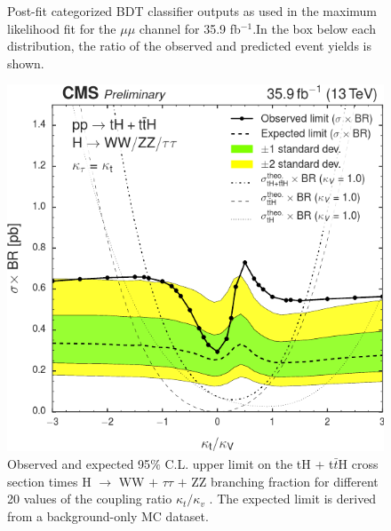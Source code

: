 \documentclass[11pt]{beamer}
\begin{document}
{\begin{frame}
\begin{multicols}{2}
\begin{center}
\begin{figure}
		\caption*{\tiny{Post-fit categorized BDT classifier outputs as used in
			the maximum likelihood fit for the $\mu\mu$ channel for
			35.9 fb$^{-1}$.In the box below each distribution, the ratio
			of the observed and predicted event yields is shown.\cite{2}
		 }}
	\end{figure}
\end{center}
\end{multicols}
\end{frame}
}
\begin{frame}
	\begin{center}
		\begin{figure}
			\includegraphics[scale=0.3]{figures/sc.png}
			\caption{Observed and expected 95$\%$ C.L. upper limit on the tH + t$\bar{t}$H cross section times H $\rightarrow$ WW $+$ $\tau\tau$ $+$ ZZ branching fraction for different 20 values of the coupling ratio $\kappa_t /\kappa_v$ . The expected limit is derived from a background-only MC dataset.}
		\end{figure}
	\end{center}
\end{frame}
\end{document}
